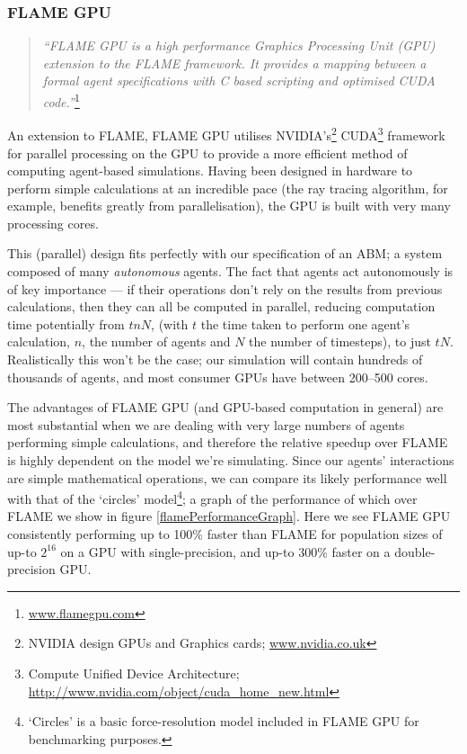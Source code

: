 \documentclass[11pt,a4paper]{article}
\begin{document}
\subsubsection{FLAME GPU}
\begin{quotation}
\noindent \emph{``FLAME GPU is a high performance Graphics Processing Unit (GPU) extension to the FLAME framework. It provides a mapping between a formal agent specifications with C based scripting and optimised CUDA code.''}\footnote{\url{www.flamegpu.com}}
\end{quotation}
\label{flameGPU}
An extension to FLAME, FLAME GPU utilises NVIDIA's\footnote{NVIDIA design GPUs and Graphics cards; \url{www.nvidia.co.uk}} CUDA\footnote{Compute Unified Device Architecture; \url{http://www.nvidia.com/object/cuda_home_new.html}} framework for parallel processing on the GPU to provide a more efficient method of computing agent-based simulations. Having been designed in hardware to perform simple calculations at an incredible pace (the ray tracing algorithm, for example, benefits greatly from parallelisation), the GPU is built with very many processing cores. %

This (parallel) design fits perfectly with our specification of an ABM; a system composed of many \emph{autonomous} agents. The fact that agents act autonomously is of key importance --- if their operations don't rely on the results from previous calculations, then they can all be computed in parallel, reducing computation time potentially from $tnN$, (with $t$ the time taken to perform one agent's calculation, $n$, the number of agents and $N$ the number of timesteps), to just $tN$. Realistically this won't be the case; our simulation will contain hundreds of thousands of agents, and most consumer GPUs have between 200--500 cores.

The advantages of FLAME GPU (and GPU-based computation in general) are most substantial when we are dealing with very large numbers of agents performing simple calculations, and therefore the relative speedup over FLAME is highly dependent on the model we're simulating. Since our agents' interactions are simple mathematical operations, we can compare its likely performance well with that of the `circles' model\footnote{`Circles' is a basic force-resolution model included in FLAME GPU for benchmarking purposes.}; a graph of the performance of which over FLAME we show in figure \ref{flamePerformanceGraph}. Here we see FLAME GPU consistently performing up to 100\% faster than FLAME for population sizes of up-to $2^{16}$ on a GPU with single-precision, and up-to 300\% faster on a double-precision GPU.
\end{document}
